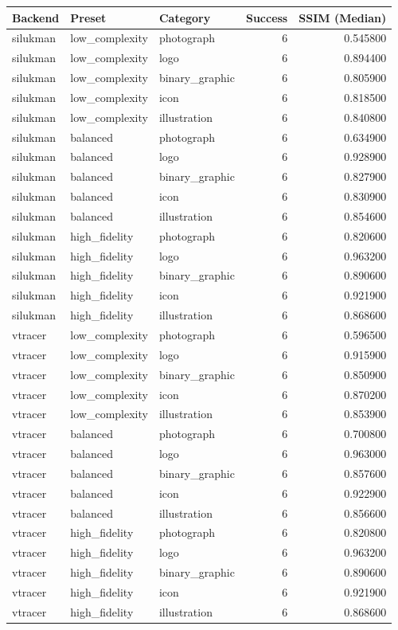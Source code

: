 \begin{tabular}{lllrr}
\toprule
Backend & Preset & Category & Success & SSIM (Median) \\
\midrule
silukman & low_complexity & photograph & 6 & 0.545800 \\
silukman & low_complexity & logo & 6 & 0.894400 \\
silukman & low_complexity & binary_graphic & 6 & 0.805900 \\
silukman & low_complexity & icon & 6 & 0.818500 \\
silukman & low_complexity & illustration & 6 & 0.840800 \\
silukman & balanced & photograph & 6 & 0.634900 \\
silukman & balanced & logo & 6 & 0.928900 \\
silukman & balanced & binary_graphic & 6 & 0.827900 \\
silukman & balanced & icon & 6 & 0.830900 \\
silukman & balanced & illustration & 6 & 0.854600 \\
silukman & high_fidelity & photograph & 6 & 0.820600 \\
silukman & high_fidelity & logo & 6 & 0.963200 \\
silukman & high_fidelity & binary_graphic & 6 & 0.890600 \\
silukman & high_fidelity & icon & 6 & 0.921900 \\
silukman & high_fidelity & illustration & 6 & 0.868600 \\
vtracer & low_complexity & photograph & 6 & 0.596500 \\
vtracer & low_complexity & logo & 6 & 0.915900 \\
vtracer & low_complexity & binary_graphic & 6 & 0.850900 \\
vtracer & low_complexity & icon & 6 & 0.870200 \\
vtracer & low_complexity & illustration & 6 & 0.853900 \\
vtracer & balanced & photograph & 6 & 0.700800 \\
vtracer & balanced & logo & 6 & 0.963000 \\
vtracer & balanced & binary_graphic & 6 & 0.857600 \\
vtracer & balanced & icon & 6 & 0.922900 \\
vtracer & balanced & illustration & 6 & 0.856600 \\
vtracer & high_fidelity & photograph & 6 & 0.820800 \\
vtracer & high_fidelity & logo & 6 & 0.963200 \\
vtracer & high_fidelity & binary_graphic & 6 & 0.890600 \\
vtracer & high_fidelity & icon & 6 & 0.921900 \\
vtracer & high_fidelity & illustration & 6 & 0.868600 \\
\bottomrule
\end{tabular}

